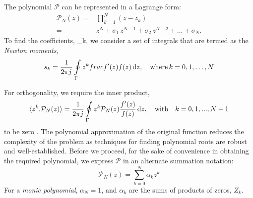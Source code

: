 \documentclass[11pt]{article}
\begin{document}
The polynomial $\mathcal P$ can be represented in a Lagrange form:
%
\begin{equation}
  \begin{split}
    \mathcal{P}_N(z) ={}& \prod \limits_{k = 1}^N \left(z - z_k \right) \\
    ={}& z^N + \sigma_1 \, z^{N-1} + \sigma_2 \, z^{N-2} + \dots + \sigma_N.
  \end{split}
  \label{eq:poly}%
\end{equation}
%
To find the coefficients, \sigma_k, we consider a set of integrals that are termed as the \emph{Newton moments},
%
\begin{equation}
  s_k = \frac{1}{2 \pi j\mkern1mu} \oint \limits_{\Gamma} z^k frac{f'(z)}{f(z)} \mathop{}\!\mathrm{d}{z}, \quad \text{where} \, k = 0,1,\dots, N
  \label{eq:s_k}
\end{equation}
%






For orthogonality, we require the inner product,
%
\begin{equation}
  \langle z^k{,} \mathcal{P}_N(z)\rangle = \frac{1}{2 \pi j} \oint \limits_{\Gamma} z^k \mathcal{P}_N(z) \frac{f'(z)}{f(z)} \dif z, \quad \mathrm{with}\quad k = 0,1,...,N-1
  \label{eq:fop}
\end{equation}
%
to be zero \cite{Kravanja2000c}. The polynomial approximation of the original function reduces the complexity of the problem as techniques for finding polynomial roots are robust and well-established. Before we proceed, for the sake of convenience in obtaining the required polynomial, we express $\mathcal{P}$ in an alternate summation notation:
%
\begin{equation}
  \mathcal{P}_N(z) = \sum \limits_{k = 0}^N \alpha_k z^k
  \label{eq:poly_sum}
\end{equation}
%
For a \emph{monic polynomial}, $\alpha_N = 1$, and $\alpha_k$ are the sums of products of zeros, $Z_k$.
\end{document}

